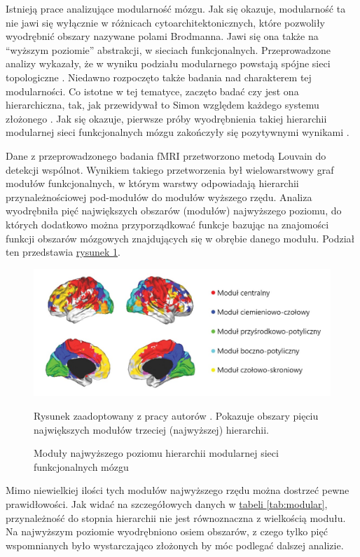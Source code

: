 Istnieją prace analizujące modularność mózgu.
Jak się okazuje, modularność ta nie jawi się wyłącznie w różnicach cytoarchitektonicznych, które pozwoliły wyodrębnić obszary nazywane polami Brodmanna.
Jawi się ona także na ``wyższym poziomie'' abstrakcji, w sieciach funkcjonalnych.
Przeprowadzone analizy wykazały, że w wyniku podziału modularnego powstają spójne sieci topologiczne \cite{bullmore2009complex}.
Niedawno rozpoczęto także badania nad charakterem tej modularności.
Co istotne w tej tematyce, zaczęto badać czy jest ona hierarchiczna, tak, jak przewidywał to Simon względem każdego systemu złożonego \cite{simon1962architecture}.
Jak się okazuje, pierwsze próby wyodrębnienia takiej hierarchii modularnej sieci funkcjonalnych mózgu zakończyły się pozytywnymi wynikami \cite{meunier2009hierarchical}.

Dane z przeprowadzonego badania fMRI przetworzono metodą Louvain do detekcji wspólnot.
Wynikiem takiego przetworzenia był wielowarstwowy graf modułów funkcjonalnych, w którym warstwy odpowiadają hierarchii przynależnościowej pod-modułów do modułów wyższego rzędu.
Analiza wyodrębniła pięć największych obszarów (modułów) najwyższego poziomu, do których dodatkowo można przyporządkować funkcje bazując na znajomości funkcji obszarów mózgowych znajdujących się w obrębie danego modułu.
Podział ten przedstawia \hyperref[fig:brain-functional-modules]{rysunek \ref*{fig:brain-functional-modules}}.

\begin{figure}[t]
	\includegraphics[width=\textwidth]{Images/BrainFunctionalModules}
	\caption{Moduły najwyższego poziomu hierarchii modularnej sieci funkcjonalnych mózgu}
	Rysunek zaadoptowany z pracy autorów \cite{meunier2009hierarchical}.
	Pokazuje obszary pięciu największych modułów trzeciej (najwyższej) hierarchii.
	\label{fig:brain-functional-modules}
\end{figure}

Mimo niewielkiej ilości tych modułów najwyższego rzędu można dostrzeć pewne prawidłowości.
Jak widać na szczegółowych danych w \hyperref[tab:modular]{tabeli \ref*{tab:modular}}, przynależność do stopnia hierarchii nie jest równoznaczna z wielkością modułu.
Na najwyższym poziomie wyodrębniono osiem obszarów, z czego tylko pięć wspomnianych było wystarczająco złożonych by móc podlegać dalszej analizie.

